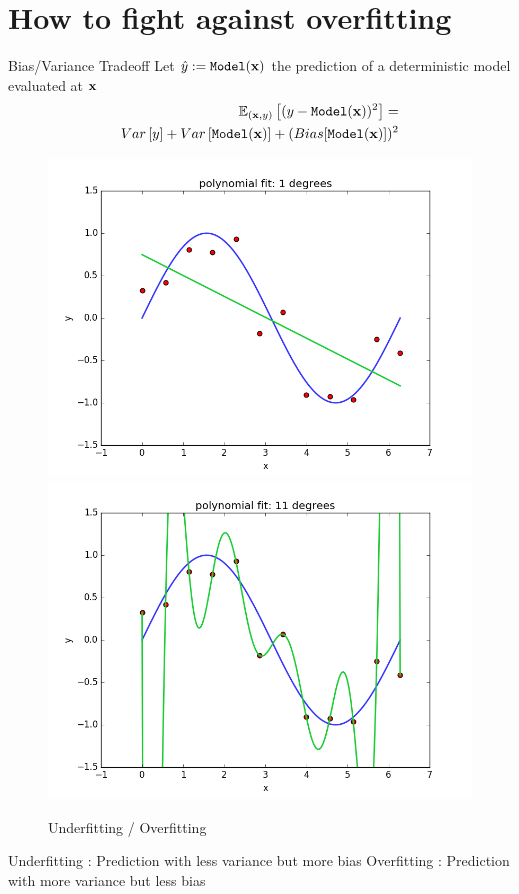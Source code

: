\documentclass[xcolor=pdftex,dvipsnames,table,mathserif]{beamer}
\begin{document}
\section{How to fight against overfitting}

\begin{frame}{Bias/Variance Tradeoff}
Let $\hat{y}:=\texttt{Model}(\mathbf{x})$ the prediction of a deterministic model evaluated at $\mathbf{x}$
\begin{eqnarray*}
\mathbb{E}_{(\mathbf{x},y)}\left [ (y-\texttt{Model}(\mathbf{x}))^ 2\right ] = \\ Var\left[y \right] + Var \left[ \texttt{Model}(\mathbf{x}) \right] + (Bias [\texttt{Model}(\mathbf{x})])^2
\end{eqnarray*}
\begin{figure}
\includegraphics[width=.45 \columnwidth]{../graphics/polyfit_degree_1}
\includegraphics[width=.45 \columnwidth]{../graphics/polyfit_degree_11}
\caption{Underfitting / Overfitting}
\end{figure}
Underfitting : Prediction with less variance but more bias
Overfitting : Prediction with more variance but less bias
\end{frame}
\end{document}
